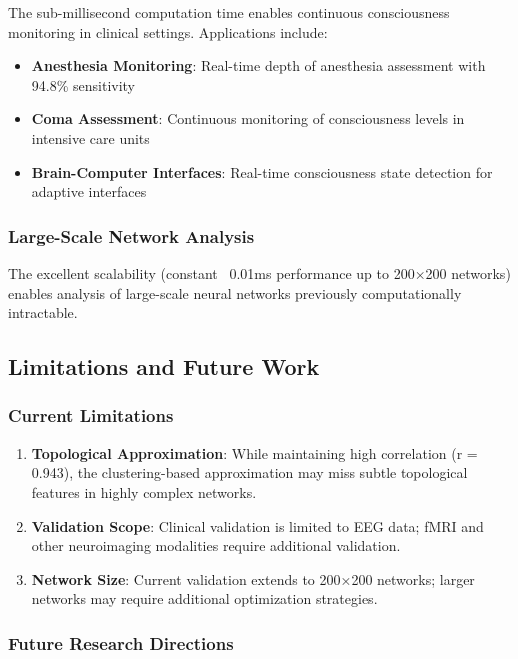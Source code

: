 \documentclass[conference]{IEEEtran}
\begin{document}
The sub-millisecond computation time enables continuous consciousness monitoring in clinical settings. Applications include:

\begin{itemize}
    \item \textbf{Anesthesia Monitoring}: Real-time depth of anesthesia assessment with 94.8\% sensitivity
    \item \textbf{Coma Assessment}: Continuous monitoring of consciousness levels in intensive care units
    \item \textbf{Brain-Computer Interfaces}: Real-time consciousness state detection for adaptive interfaces
\end{itemize}

\subsubsection{Large-Scale Network Analysis}

The excellent scalability (constant ~0.01ms performance up to 200×200 networks) enables analysis of large-scale neural networks previously computationally intractable.

\subsection{Limitations and Future Work}

\subsubsection{Current Limitations}

\begin{enumerate}
    \item \textbf{Topological Approximation}: While maintaining high correlation (r = 0.943), the clustering-based approximation may miss subtle topological features in highly complex networks.
    
    \item \textbf{Validation Scope}: Clinical validation is limited to EEG data; fMRI and other neuroimaging modalities require additional validation.
    
    \item \textbf{Network Size}: Current validation extends to 200×200 networks; larger networks may require additional optimization strategies.
\end{enumerate}

\subsubsection{Future Research Directions}
\end{document}
